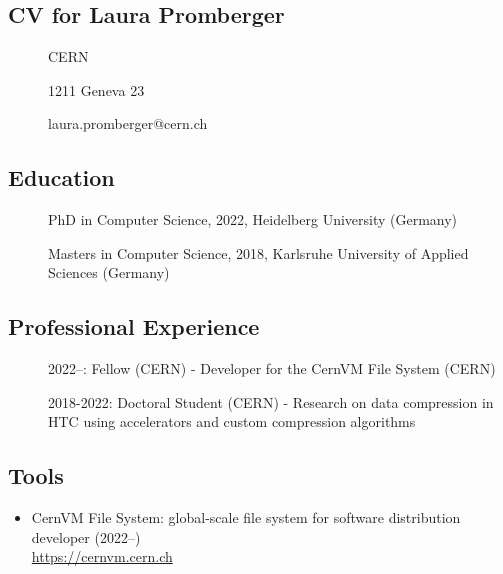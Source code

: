 
\subsection{CV for Laura Promberger}
\begin{description}
\item[] CERN
\item[] 1211 Geneva 23
\item[] laura.promberger@cern.ch
\end{description}

\subsection*{Education}
\begin{description}
    \item[] PhD in Computer Science, 2022, Heidelberg University (Germany)
    \item[] Masters in Computer Science, 2018, Karlsruhe University of Applied Sciences (Germany)
\end{description}

\subsection*{Professional Experience}
\begin{description}
    \item[] 2022--: Fellow (CERN) - Developer for the CernVM File System (CERN)
    \item[] 2018-2022: Doctoral Student (CERN) - Research on data compression in HTC using accelerators and custom compression algorithms
\end{description}

\subsection*{Tools}

\begin{itemize}
    \item[] CernVM File System: global-scale file system for software distribution
    \\developer (2022--)
    \\{\small{\url{https://cernvm.cern.ch}}}
\end{itemize}

